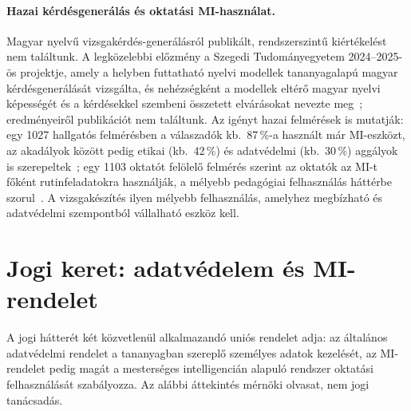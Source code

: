 \paragraph{Hazai kérdésgenerálás és oktatási MI-használat.} Magyar nyelvű vizsgakérdés-generálásról
publikált, rendszerszintű kiértékelést nem találtunk. A legközelebbi előzmény a Szegedi
Tudományegyetem 2024--2025-ös projektje, amely a helyben futtatható nyelvi modellek tananyagalapú magyar
kérdésgenerálását vizsgálta, és nehézségként a modellek eltérő magyar nyelvi képességét és a kérdésekkel
szembeni összetett elvárásokat nevezte meg~\cite{szte2025kerdesgen}; eredményeiről publikációt nem
találtunk. Az igényt hazai felmérések is mutatják: egy 1027 hallgatós felmérésben a válaszadók kb.\
87\,\%-a használt már MI-eszközt, az akadályok között pedig etikai (kb.\ 42\,\%) és adatvédelmi (kb.\
30\,\%) aggályok is szerepeltek~\cite{rajki2024hallgatoi}; egy 1103 oktatót felölelő felmérés szerint az
oktatók az MI-t főként rutinfeladatokra használják, a mélyebb pedagógiai felhasználás háttérbe
szorul~\cite{tnagy2025oktatoi}. A vizsgakészítés ilyen mélyebb felhasználás, amelyhez megbízható és
adatvédelmi szempontból vállalható eszköz kell.

\section{Jogi keret: adatvédelem és MI-rendelet}
\label{sec:irod-jog}

A \prob{P3} jogi hátterét két közvetlenül alkalmazandó uniós rendelet adja: az általános adatvédelmi
rendelet a tananyagban szereplő személyes adatok kezelését, az MI-rendelet pedig magát a mesterséges
intelligencián alapuló rendszer oktatási felhasználását szabályozza. Az alábbi áttekintés mérnöki olvasat,
nem jogi tanácsadás.

